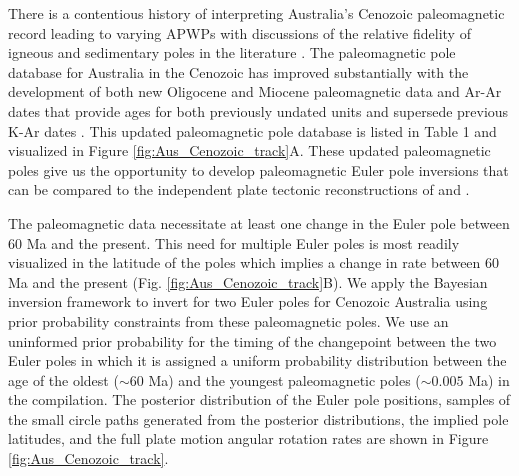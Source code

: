 \documentclass[11pt,letterpaper]{article}
\begin{document}
There is a contentious history of interpreting Australia's Cenozoic paleomagnetic record leading to varying APWPs with discussions of the relative fidelity of igneous and sedimentary poles in the literature \cite[e.g.][]{Idnurm1985a, Musgrave1989a, Idnurm1994a, Hansma2019a}. The paleomagnetic pole database for Australia in the Cenozoic has improved substantially with the development of both new Oligocene and Miocene paleomagnetic data \citep{Hansma2018a, Hansma2019a} and Ar-Ar dates that provide ages for both previously undated units and supersede previous K-Ar dates \citep{Cohen2008a,Knesel2008a,Cohen2013a}. This updated paleomagnetic pole database is listed in Table 1 and visualized in Figure \ref{fig:Aus_Cenozoic_track}A. These updated paleomagnetic poles give us the opportunity to develop paleomagnetic Euler pole inversions that can be compared to the independent plate tectonic reconstructions of  and . 

The paleomagnetic data necessitate at least one change in the Euler pole between 60 Ma and the present. This need for multiple Euler poles is most readily visualized in the latitude of the poles which implies a change in rate between 60 Ma and the present (Fig. \ref{fig:Aus_Cenozoic_track}B). We apply the Bayesian inversion framework to invert for two Euler poles for Cenozoic Australia using prior probability constraints from these paleomagnetic poles. We use an uninformed prior probability for the timing of the changepoint between the two Euler poles in which it is assigned a uniform probability distribution between the age of the oldest ($\sim60$ Ma) and the youngest paleomagnetic poles ($\sim0.005$ Ma) in the compilation. The posterior distribution of the Euler pole positions, samples of the small circle paths generated from the posterior distributions, the implied pole latitudes, and the full plate motion angular rotation rates are shown in Figure \ref{fig:Aus_Cenozoic_track}. 
\end{document}
